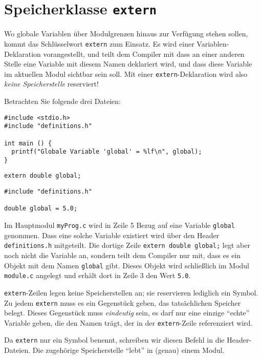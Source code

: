 \section{Speicherklasse \texttt{extern}}
Wo globale Variablen über Modulgrenzen hinaus zur Verfügung stehen sollen, kommt das Schlüsselwort \texttt{extern} zum Einsatz. Es wird einer Variablen-Deklaration vorangestellt, und teilt dem Compiler mit dass an einer anderen Stelle eine Variable mit diesem Namen deklariert wird, und dass diese Variable im aktuellen Modul sichtbar sein soll. Mit einer \texttt{extern}-Deklaration wird also \emph{keine Speicherstelle} reserviert!

Betrachten Sie folgende drei Dateien:

\begin{codebox}
\begin{verbatim}
#include <stdio.h>
#include "definitions.h"

int main () {
  printf("Globale Variable 'global' = %lf\n", global);
}
\end{verbatim}
\end{codebox}

\begin{codebox}
\begin{verbatim}
extern double global;
\end{verbatim}
\end{codebox}

\begin{codebox}
\begin{verbatim}
#include "definitions.h"

double global = 5.0;
\end{verbatim}
\end{codebox}

Im Hauptmodul \texttt{myProg.c} wird in Zeile 5 Bezug auf eine Variable \texttt{global} genommen. Dass eine solche Variable existiert wird über den Header \texttt{definitions.h} mitgeteilt. Die dortige Zeile \texttt{extern double global;} legt aber noch nicht die Variable an, sondern teilt dem Compiler nur mit, dass es ein Objekt mit dem Namen \texttt{global} gibt. Dieses Objekt wird schließlich im Modul \texttt{module.c} angelegt und erhält dort in Zeile 3 den Wert \texttt{5.0}.

\begin{warnbox}
\texttt{extern}-Zeilen legen keine Speicherstellen an; sie reservieren lediglich ein Symbol. Zu jedem \texttt{extern} muss es ein Gegenstück geben, das tatsächlichen Speicher belegt. Dieses Gegenstück muss \emph{eindeutig} sein, \ie es darf nur eine einzige \enquote{echte} Variable geben, die den Namen trägt, der in der \texttt{extern}-Zeile referenziert wird.

Da \texttt{extern} nur ein Symbol benennt, schreiben wir diesen Befehl in die Header-Dateien. Die zugehörige Speicherstelle \enquote{lebt} in (genau) einem Modul.
\end{warnbox}

